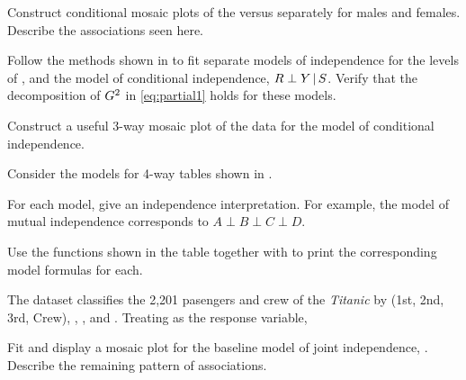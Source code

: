 \documentclass[10pt]{report}\usepackage[]{graphicx}\usepackage[]{color}
\begin{document}
\begin{Exercises}
\begin{enumerate*}
      \item Construct conditional mosaic plots of the  versus  separately for males and females.
      Describe the associations seen here.
      \begin{ans}
      \end{ans}
      
      \item Follow the methods shown in  to fit separate models of independence for the levels of ,
      and the model of conditional independence, $R \perp Y \, | \, S$.
      Verify that the decomposition of $G^2$ in \eqref{eq:partial1} holds for these models.
      \begin{ans}
      \end{ans}
      
      \item Construct a useful 3-way mosaic plot of the data for the model of conditional independence.
      \begin{ans}
      \end{ans}
      
    \end{enumerate*}

\exercise Consider the models for 4-way tables shown in . 
  \begin{enumerate*}
    \item For each model, give an independence interpretation.  For example, the model of mutual
    independence corresponds to $A \perp B \perp C \perp D$.
    \begin{ans}
    \end{ans}
    
    \item Use the functions shown in the table together with  to print the
    corresponding model formulas for each.
    \begin{ans}
    \end{ans}
    
  \end{enumerate*}
  
  \exercise\label{lab:mosaic-titanic} The dataset  classifies the 2,201 pasengers and crew of the \emph{Titanic}
  by  (1st, 2nd, 3rd, Crew), , , and . Treating  as the response variable,
    \begin{enumerate*}
      \item Fit and display a mosaic plot for the baseline model of joint independence, . Describe the remaining
      pattern of associations.
      \begin{ans}
      \end{ans}
      

\end{enumerate*}
\end{Exercises}
\end{document}
